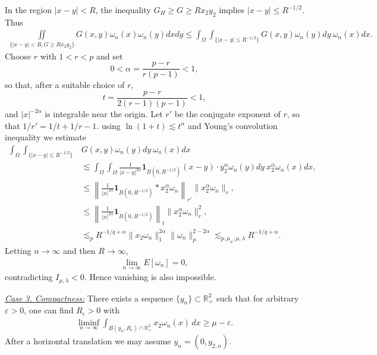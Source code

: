 \documentclass[11pt,letterpaper]{amsart}
\theoremstyle{definition}
\theoremstyle{remark}
\renewcommand{\O}{\Omega}
\newcommand{\eps}{\epsilon}
\numberwithin{equation}{section}
\begin{document}
In the region $|x-y|<R$, the inequality $G_H\geq G \geq R x_2 y_2$ implies $|x-y|\leq R^{-1/2}$. Thus
\begin{align*}
    \iint\limits_{ \{ |x-y|< R, G \geq Rx_2y_2\} } G(x,y)\omega_n(x)\omega_n(y)dxdy \leq \int_{\Omega}\int_{ \{ |x-y|\leq R^{-1/2}\} } G(x,y)\omega_n(y)dy ~ \omega_n(x) dx.
\end{align*}
Choose $r$ with $1<r<p$ and set
$$0<\alpha=\frac{p-r}{r(p-1)} <1,$$ 
so that, after a suitable choice of  $r$, 
$$t=\frac{p-r}{2(r-1)(p-1)}<1,$$
and $|x|^{-2\alpha}$ is integrable near the origin. Let $r'$ be the conjugate exponent of $r$, so that $1/r' = 1/t + 1/r -1$. using $\ln(1+t)\lesssim t^\alpha$ and Young’s convolution inequality we estimate
\begin{align*}
    \int_{\Omega}\int_{ \{ |x-y|\leq R^{-1/2}\} } & G(x,y)\omega_n(y)dy ~ \omega_n(x) dx \\
    & \lesssim \int_{\Omega}\int_{\O} \frac{1}{|x-y|^{2\alpha}} \mathbf{1}_{ B(0,R^{-1/2})}(x-y) \cdot y_2^\alpha\omega_n(y)dy ~ x_2^\alpha \omega_n(x) dx, \\ 
    & \leq \left\| \frac{1}{|x|^{2\alpha}}\mathbf{1}_{ B(0,R^{-1/2})} \ast  x_2^\alpha\omega_n \right\|_{r'} \|x_2^\alpha\omega_n \|_r, \\
    & \leq \left\| \frac{1}{|x|^{2\alpha}}\mathbf{1}_{ B(0,R^{-1/2})}\right\|_{t} \|x_2^\alpha\omega_n \|_r^2, \\
    & \lesssim_p R^{-1/q +\alpha}\|x_2\omega_n\|_1^{2\alpha}\|\omega_n\|_p^{2-2\alpha} \lesssim_{p,\mu_n, \mu, \lambda} R^{-1/q +\alpha}.
\end{align*}
Letting $n\to \infty$ and then $R\to \infty$, 
\begin{align*}
    \lim_{n\to \infty}E[\omega_n] = 0,
\end{align*}
contradicting $I_{\mu,\lambda}<0$. Hence vanishing is also impossible.

\underline{\textit{Case 3. Compactness:}} 
There exists a sequence $\{y_n\} \subset \mathbb{R}^2_+$ such that for arbitrary $\varepsilon > 0$, one can find $R_\eps > 0$ with
\begin{align}
    \liminf_{n\to\infty} \int_{B(y_n,R_\eps)\cap\mathbb{R}^2_+} x_2\omega_n(x) \,dx \ge \mu - \varepsilon. \label{ineq:compactness of minimizing sequence}
\end{align}
After a horizontal translation we may assume $y_n = (0, y_{2,n})$.
\end{document}
